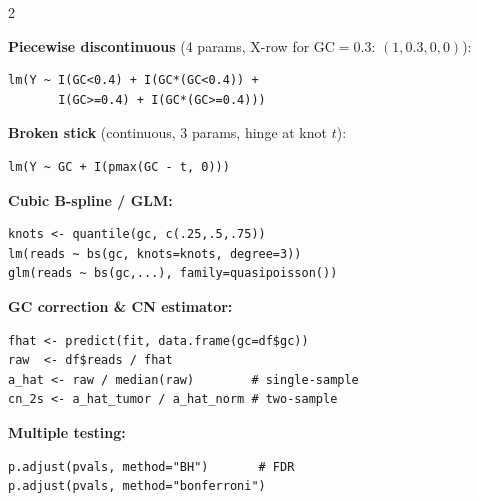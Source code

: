 \documentclass[12pt,a4paper]{article}
\begin{document}
\begin{multicols}{2}
{\textbf{Piecewise discontinuous} (4 params, X-row for GC$=0.3$: $(1,0.3,0,0)$):
\begin{lstlisting}
lm(Y ~ I(GC<0.4) + I(GC*(GC<0.4)) +
       I(GC>=0.4) + I(GC*(GC>=0.4)))
\end{lstlisting}

\textbf{Broken stick} (continuous, 3 params, hinge at knot $t$):
\begin{lstlisting}
lm(Y ~ GC + I(pmax(GC - t, 0)))
\end{lstlisting}

\textbf{Cubic B-spline / GLM:}
\begin{lstlisting}
knots <- quantile(gc, c(.25,.5,.75))
lm(reads ~ bs(gc, knots=knots, degree=3))
glm(reads ~ bs(gc,...), family=quasipoisson())
\end{lstlisting}

\textbf{GC correction \& CN estimator:}
\begin{lstlisting}
fhat <- predict(fit, data.frame(gc=df$gc))
raw  <- df$reads / fhat
a_hat <- raw / median(raw)        # single-sample
cn_2s <- a_hat_tumor / a_hat_norm # two-sample
\end{lstlisting}

\textbf{Multiple testing:}
\begin{lstlisting}
p.adjust(pvals, method="BH")       # FDR
p.adjust(pvals, method="bonferroni")
\end{lstlisting}
}

\end{multicols}
\end{document}
